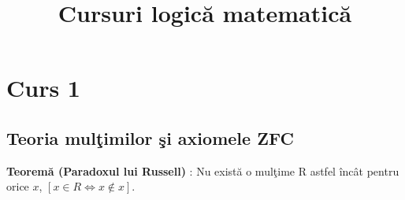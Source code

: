 \documentclass{article}
\title{Cursuri logic\u{a} matematic\u{a}}
\begin{document}
\maketitle
\setlength{\parindent}{10pt}
\setlength{\parskip}{0.5\baselineskip}

\section{Curs 1}

\subsection{Teoria mul\c{t}imilor \c{s}i axiomele ZFC}

\textbf{Teorem\u{a} (Paradoxul lui Russell)} : Nu exist\u{a} o mul\c{t}ime R astfel \^{i}nc\^{a}t pentru orice $x$, $[x \in R \iff x\notin x]$.
\end{document}
